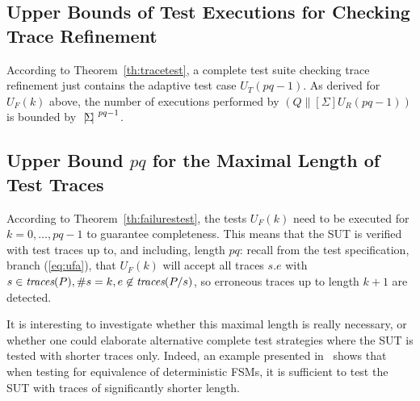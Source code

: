 \subsection{Upper Bounds of Test Executions for Checking Trace Refinement}

According to Theorem~\ref{th:tracetest}, a complete test suite checking trace
refinement just contains the adaptive test case $U_T(pq-1)$. As derived for
$U_F(k)$ above, the number of executions performed by $(Q\parallel[\Sigma]
U_R(pq-1))$ is bounded by ${~|\! \Sigma\!|~}^{pq-1}$. 

\subsection{Upper Bound $pq$ for the Maximal Length of Test Traces}

According to Theorem~\ref{th:failurestest}, the tests $U_F(k)$ need to be
executed for $k = 0,\dots,pq-1$ to guarantee completeness.  This means that the SUT is verified with test
traces up to, and including, length $pq$: recall from the test specification,
branch (\ref{eq:ufa}), that $U_F(k)$ will accept all traces $s.e$ with
$s\in\text{\it traces}(P), \#s = k, e\not\in\text{\it traces}(P/s)$, so erroneous traces up to length
$k+1$ are detected.

It is interesting to investigate whether this maximal length is really
necessary, or whether one could elaborate alternative complete test
strategies where the SUT is tested with shorter traces only. Indeed, an
example  presented in~\cite[Exercise~5]{PeleskaHuangLectureNotesMBT} shows
that when testing for equivalence of deterministic FSMs, it is sufficient to
test the SUT with traces of significantly shorter length.

